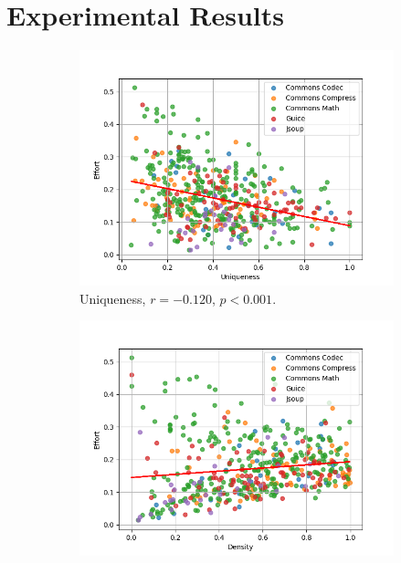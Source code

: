 \documentclass[twoside,a4paper,11pt]{memoir}
\begin{document}
\section{Experimental Results}
\label{sec:rq2_experimental_results}

\begin{figure}
    \centering
    \begin{subfigure}[b]{0.49\linewidth}
        \centering
        \includegraphics[width=\linewidth]{figures/effort_uniqueness}
        \caption{Uniqueness, $r = -0.120$, $p < 0.001$.}
        \label{fig:effort_uniqueness}
    \end{subfigure}
    \hfill
    \begin{subfigure}[b]{0.49\linewidth}
        \centering
        \includegraphics[width=\linewidth]{figures/effort_density}

\end{subfigure}
\end{figure}
\end{document}
